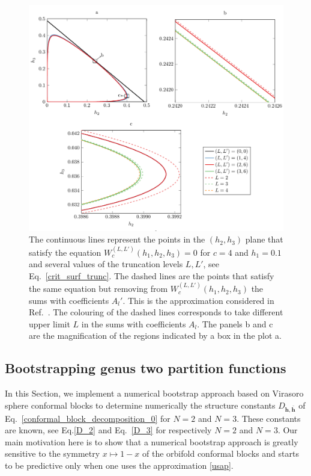\documentclass[a4paper,11pt]{article}
\begin{document}
\begin{figure}[t]
 \centering 
 \includegraphics[width=\textwidth]{constraints_strt.pdf}
\caption{The continuous lines represent the points in the $(h_2, h_3)$ plane that 
satisfy the equation $W_c^{(L, L')}(h_1, h_2, h_3)=0$ for $c=4$ and $h_1=0.1$ and several 
values of the truncation levels $L, L'$, see Eq.~\eqref{crit_surf_trunc}. The dashed lines 
are the points that satisfy the same equation but removing from $W_c^{(L, L')}(h_1, h_2, h_3)$
the sums with coefficients $A_l'$. This is the approximation considered in Ref.~\cite{Collier}.
The colouring of the dashed lines corresponds to take different upper limit $L$
in the sums with coefficients $A_l$. The panels b and c are the magnification of the regions
indicated by a box in the plot a.}\label{fig:constraints_strt}
\end{figure}

\subsection{Bootstrapping genus two partition functions}


In this Section, we implement  a numerical bootstrap approach based on Virasoro sphere conformal blocks
to determine numerically the structure constants $D_{\boldsymbol{h}, \boldsymbol{\bar{h}}}$  
of Eq.~\eqref{conformal_block_decomposition_0} for $N=2$ and $N=3$. These constants are known, see Eq.\eqref{D_2} and Eq.~\eqref{D_3} for respectively $N=2$ and $N=3$.  Our main motivation here is to show that a numerical bootstrap approach is greatly sensitive to the symmetry $x\mapsto 1-x$ of the orbifold conformal blocks and starts to be predictive only when one uses the approximation \eqref{usap}. 
\end{document}
